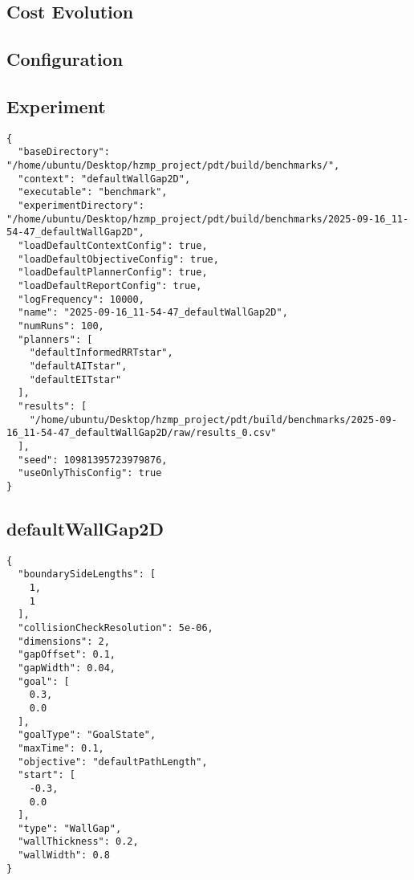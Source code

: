 \documentclass[titlepage]{article}
\begin{document}
\subsection{Cost Evolution}\label{sec:defaultEITstar-cost-evolution}
\begin{center}

\end{center}

\pagebreak
\begin{appendices}
\section{Configuration}\label{sec:configuration}
\subsection{Experiment}\label{sec:experiment-configuration}
\begin{lstlisting}
{
  "baseDirectory": "/home/ubuntu/Desktop/hzmp_project/pdt/build/benchmarks/",
  "context": "defaultWallGap2D",
  "executable": "benchmark",
  "experimentDirectory": "/home/ubuntu/Desktop/hzmp_project/pdt/build/benchmarks/2025-09-16_11-54-47_defaultWallGap2D",
  "loadDefaultContextConfig": true,
  "loadDefaultObjectiveConfig": true,
  "loadDefaultPlannerConfig": true,
  "loadDefaultReportConfig": true,
  "logFrequency": 10000,
  "name": "2025-09-16_11-54-47_defaultWallGap2D",
  "numRuns": 100,
  "planners": [
    "defaultInformedRRTstar",
    "defaultAITstar",
    "defaultEITstar"
  ],
  "results": [
    "/home/ubuntu/Desktop/hzmp_project/pdt/build/benchmarks/2025-09-16_11-54-47_defaultWallGap2D/raw/results_0.csv"
  ],
  "seed": 10981395723979876,
  "useOnlyThisConfig": true
}\end{lstlisting}
\subsection{defaultWallGap2D}\label{sec:context-configuration}
\begin{lstlisting}
{
  "boundarySideLengths": [
    1,
    1
  ],
  "collisionCheckResolution": 5e-06,
  "dimensions": 2,
  "gapOffset": 0.1,
  "gapWidth": 0.04,
  "goal": [
    0.3,
    0.0
  ],
  "goalType": "GoalState",
  "maxTime": 0.1,
  "objective": "defaultPathLength",
  "start": [
    -0.3,
    0.0
  ],
  "type": "WallGap",
  "wallThickness": 0.2,
  "wallWidth": 0.8
}\end{lstlisting}

\end{appendices}
\end{document}
